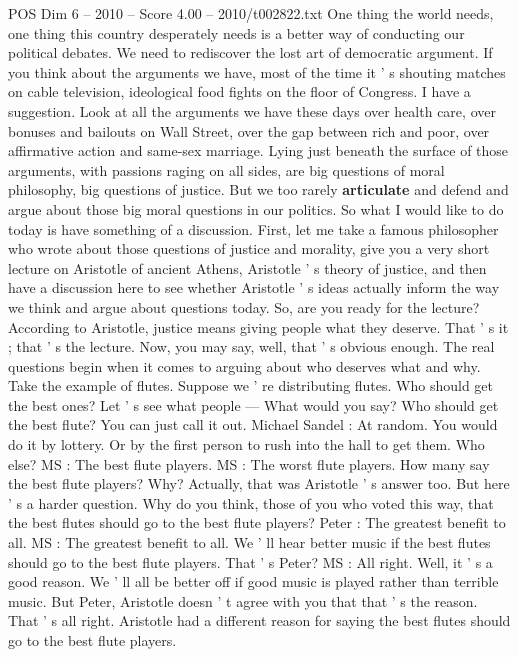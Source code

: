 \begin{textsample}{POS Dim 6 – 2010 – Score 4.00 – 2010/t002822.txt}  \label{ex:f6_pos_040}
One thing the world needs, one thing this country desperately needs is a better way of conducting our political debates.
We need to rediscover the lost art of democratic argument.
If you think about the arguments we have, most of the time it ' s shouting matches on cable television, ideological food fights on the floor of Congress.
I have a suggestion.
Look at all the arguments we have these days over health care, over bonuses and bailouts on Wall Street, over the gap between rich and poor, over affirmative action and same-sex marriage.
Lying just beneath the surface of those arguments, with passions raging on all sides, are big questions of moral philosophy, big questions of justice.
But we too rarely \textbf{articulate} and defend and argue about those big moral questions in our politics.
So what I would like to do today is have something of a discussion.
First, let me take a famous philosopher who wrote about those questions of justice and morality, give you a very short lecture on Aristotle of ancient Athens, Aristotle ' s theory of justice, and then have a discussion here to see whether Aristotle ' s ideas actually inform the way we think and argue about questions today.
So, are you ready for the lecture?
According to Aristotle, justice means giving people what they deserve.
That ' s it ; that ' s the lecture.
Now, you may say, well, that ' s obvious enough.
The real questions begin when it comes to arguing about who deserves what and why.
Take the example of flutes.
Suppose we ' re distributing flutes.
Who should get the best ones?
Let ' s see what people — What would you say?
Who should get the best flute?
You can just call it out.
Michael Sandel : At random.
You would do it by lottery.
Or by the first person to rush into the hall to get them.
Who else?
MS : The best flute players.
MS : The worst flute players.
How many say the best flute players?
Why?
Actually, that was Aristotle ' s answer too.
But here ' s a harder question.
Why do you think, those of you who voted this way, that the best flutes should go to the best flute players?
Peter : The greatest benefit to all.
MS : The greatest benefit to all.
We ' ll hear better music if the best flutes should go to the best flute players.
That ' s Peter?
MS : All right.
Well, it ' s a good reason.
We ' ll all be better off if good music is played rather than terrible music.
But Peter, Aristotle doesn ' t agree with you that that ' s the reason.
That ' s all right.
Aristotle had a different reason for saying the best flutes should go to the best flute players.

\end{textsample}
